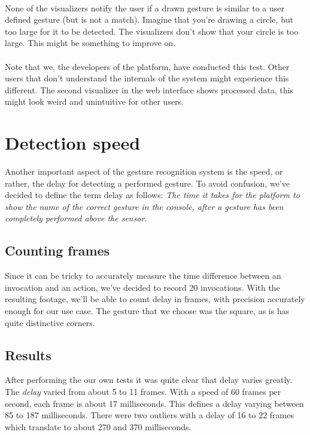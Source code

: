 \documentclass[a4paper]{article}
\begin{document}
  \paragraph{}
  None of the visualizers notify the user if a drawn gesture is similar to a
  user defined gesture (but is not a match). Imagine that you're drawing a
  circle, but too large for it to be detected. The visualizers don't show that
  your circle is too large. This might be something to improve on.

  \paragraph{}
  Note that we, the developers of the platform, have conducted this test. Other
  users that don't understand the internals of the system might experience this
  different. The second visualizer in the web interface shows processed data,
  this might look weird and unintuitive for other users.

  \clearpage

  \section*{Detection speed}
  Another important aspect of the gesture recognition system is the speed, or
  rather, the delay for detecting a performed gesture. To avoid confusion, we've
  decided to define the term delay as follows: \textit{The time it takes for the
    platform to show the name of the correct gesture in the console, after a
    gesture has been completely performed above the sensor}.

  \subsection*{Counting frames}
  Since it can be tricky to accurately measure the time difference between an
  invocation and an action, we've decided to record 20 invocations.
  With the resulting footage, we'll be able to count delay in
  frames, with precision accurately enough for our use case. The gesture that we
  choose was the square, as is has quite distinctive corners.

  \subsection*{Results}
  After performing the our own tests it was quite clear that delay varies
  greatly. The \emph{delay} varied from about 5 to 11 frames. With a speed of 60
  frames per second, each frame is about 17 milliseconds. This defines a delay
  varying between 85 to 187 milliseconds. There were two outliers with a delay
  of 16 to 22 frames which translate to about 270 and 370 milliseconds.
\end{document}

